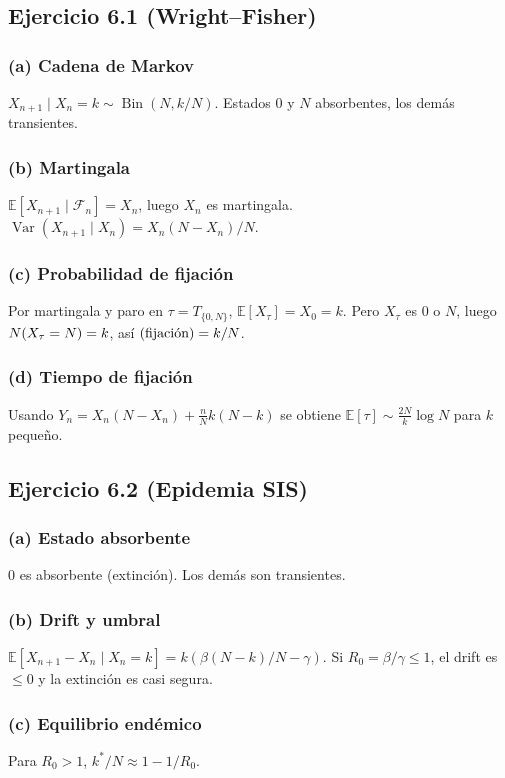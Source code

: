 \documentclass[12pt]{article}
\let\P\relax
\newcommand{\P}{\mathbb{P}}
\newcommand{\E}{\mathbb{E}}
\newcommand{\1}{\mathbf{1}}
\newcommand{\F}{\mathcal{F}}
\newcommand{\Var}{\operatorname{Var}}
\newcommand{\Bin}{\operatorname{Bin}}
\begin{document}
\subsection{Ejercicio 6.1 (Wright–Fisher)}

\subsubsection*{(a) Cadena de Markov}
$X_{n+1}\mid X_n=k\sim\Bin(N,k/N)$. Estados $0$ y $N$ absorbentes, los dem\'as transientes.

\subsubsection*{(b) Martingala}
$\E[X_{n+1}\mid\F_n]=X_n$, luego $X_n$ es martingala. $\Var(X_{n+1}\mid X_n)=X_n(N-X_n)/N$.

\subsubsection*{(c) Probabilidad de fijaci\'on}
Por martingala y paro en $\tau=T_{\{0,N\}}$, $\E[X_\tau]=X_0=k$. Pero $X_\tau$ es $0$ o $N$, luego $N\P(X_\tau=N)=k$, as\'i $\P(\text{fijaci\'on})=k/N$.

\subsubsection*{(d) Tiempo de fijaci\'on}
Usando $Y_n=X_n(N-X_n)+\frac{n}{N}k(N-k)$ se obtiene $\E[\tau]\sim\frac{2N}{k}\log N$ para $k$ peque\~no.

\subsection{Ejercicio 6.2 (Epidemia SIS)}

\subsubsection*{(a) Estado absorbente}
$0$ es absorbente (extinci\'on). Los dem\'as son transientes.

\subsubsection*{(b) Drift y umbral}
$\E[X_{n+1}-X_n\mid X_n=k]=k(\beta(N-k)/N-\gamma)$. Si $R_0=\beta/\gamma\le1$, el drift es $\le0$ y la extinci\'on es casi segura.

\subsubsection*{(c) Equilibrio end\'emico}
Para $R_0>1$, $k^*/N\approx1-1/R_0$.
\end{document}
